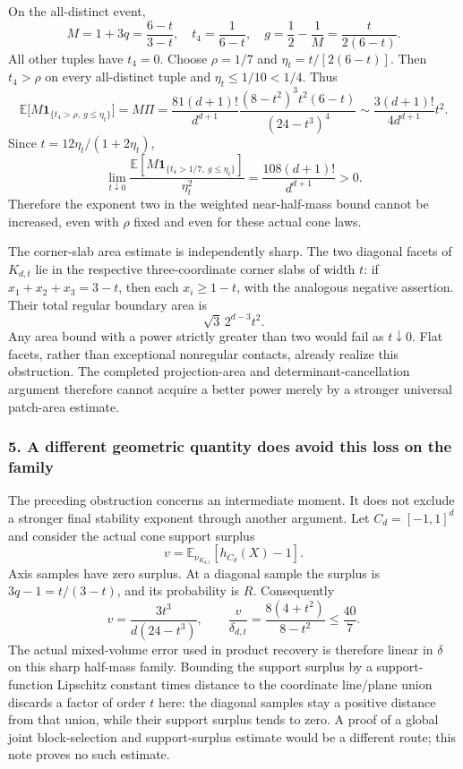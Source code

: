\documentclass[
  11pt,
]{article}
\begin{document}
On the all-distinct event, \[
 M=1+3q=\frac{6-t}{3-t},\quad
 t_4=\frac1{6-t},\quad
 g=\frac12-\frac1M=\frac{t}{2(6-t)}.
\] All other tuples have \(t_4=0\). Choose \(\rho=1/7\) and
\(\eta_t=t/[2(6-t)]\). Then \(t_4>\rho\) on every all-distinct tuple and
\(\eta_t\le1/10<1/4\). Thus \[
 \mathbb E\bigl[M\mathbf1_{\{t_4>\rho,\ g\le\eta_t\}}\bigr]
  =M\Pi
  =\frac{81(d+1)!}{d^{d+1}}
    \frac{(8-t^2)^3t^2(6-t)}{(24-t^3)^4}
  \sim\frac{3(d+1)!}{4d^{d+1}}t^2.
\] Since \(t=12\eta_t/(1+2\eta_t)\), \[
 \lim_{t\downarrow0}
 \frac{\mathbb E[M\mathbf1_{\{t_4>1/7,\ g\le\eta_t\}}]}
      {\eta_t^2}
  =\frac{108(d+1)!}{d^{d+1}}>0.                       \tag{4.1}
\] Therefore the exponent two in the weighted near-half-mass bound
cannot be increased, even with \(\rho\) fixed and even for these actual
cone laws.

The corner-slab area estimate is independently sharp. The two diagonal
facets of \(K_{d,t}\) lie in the respective three-coordinate corner
slabs of width \(t\): if \(x_1+x_2+x_3=3-t\), then each \(x_i\ge1-t\),
with the analogous negative assertion. Their total regular boundary area
is \[
 \sqrt3\,2^{d-3}t^2.
\] Any area bound with a power strictly greater than two would fail as
\(t\downarrow0\). Flat facets, rather than exceptional nonregular
contacts, already realize this obstruction. The completed
projection-area and determinant-cancellation argument therefore cannot
acquire a better power merely by a stronger universal patch-area
estimate.

\subsubsection{5. A different geometric quantity does avoid this loss on
the
family}\label{a-different-geometric-quantity-does-avoid-this-loss-on-the-family}

The preceding obstruction concerns an intermediate moment. It does not
exclude a stronger final stability exponent through another argument.
Let \(C_d=[-1,1]^d\) and consider the actual cone support surplus \[
 v=\mathbb E_{\nu_{K_{d,t}}}[h_{C_d}(X)-1].
\] Axis samples have zero surplus. At a diagonal sample the surplus is
\(3q-1=t/(3-t)\), and its probability is \(R\). Consequently \[
 \boxed{v=\frac{3t^3}{d(24-t^3)},\qquad
   \frac v{\delta_{d,t}}=\frac{8(4+t^2)}{8-t^2}
     \le\frac{40}{7}.}                                  \tag{5.1}
\] The actual mixed-volume error used in product recovery is therefore
linear in \(\delta\) on this sharp half-mass family. Bounding the
support surplus by a support-function Lipschitz constant times distance
to the coordinate line/plane union discards a factor of order \(t\)
here: the diagonal samples stay a positive distance from that union,
while their support surplus tends to zero. A proof of a global joint
block-selection and support-surplus estimate would be a different route;
this note proves no such estimate.
\end{document}
